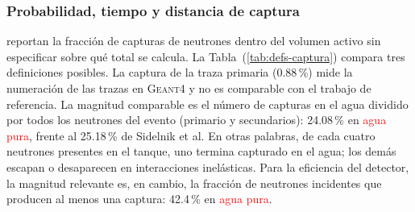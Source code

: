 \subsubsection{Probabilidad, tiempo y distancia de captura}
\label{subsubsec:captura}

\citet[Sec.~3, Tabla~2, p.~2218]{Sidelnik2020} reportan la fracción de capturas de neutrones dentro del volumen activo sin especificar sobre qué total se calcula. La Tabla~(\ref{tab:defs-captura}) compara tres definiciones posibles. La captura de la traza primaria (0.88\,\%) mide la numeración de las trazas en \textsc{Geant4} y no es comparable con el trabajo de referencia. La magnitud comparable es el número de capturas en el agua dividido por todos los neutrones del evento (primario y secundarios): 24.08\,\% en \textcolor{red}{agua pura}, frente al 25.18\,\% de Sidelnik et al. En otras palabras, de cada cuatro neutrones presentes en el tanque, uno termina capturado en el agua; los demás escapan o desaparecen en interacciones inelásticas. Para la eficiencia del detector, la magnitud relevante es, en cambio, la fracción de neutrones incidentes que producen al menos una captura: 42.4\,\% en \textcolor{red}{agua pura}.

